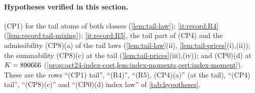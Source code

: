 \paragraph{Hypotheses verified in this section.}
(CP1) for the tail atoms of both classes (\cref{lem:tail-law});
\ref{it:record:R4} (\cref{lem:record:tail-mixing}); \ref{it:record:R5}, the
tail part of (CP4) and the admissibility (CP8)(a) of the tail laws
(\cref{lem:tail-law}(ii), \cref{lem:tail-prices}(i),(ii)); the summability (CP8)(c)
at the tail (\cref{lem:tail-prices}(iii),(iv)); and (CP0)(d) at
$K=890666$ (\cref{prop:oct24-index-cost,lem:index-moments,cert:index-moment}).
These are the rows ``(CP1) tail'', ``(R4)'', ``(R5), (CP4)(a)'' (at the tail),
``(CP4) tail'', ``(CP8)(c)'' and ``(CP0)(d) index law'' of
\cref{tab:hypotheses}.
